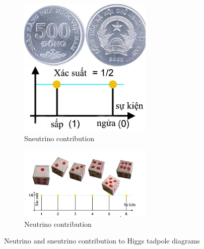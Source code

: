 \begin{figure}[h]
    \centering
    \begin{subfigure}{5cm}
        \centering
        \includegraphics[width=0.7\textwidth]{image/coin.png}
        \caption{Sneutrino contribution}
        \label{Sneutrino tadpole}
    \end{subfigure}
    \begin{subfigure}{0.49\linewidth}
        \centering
        \includegraphics[width=0.7\textwidth]{image/xucxac.png}
        \caption{Neutrino contribution}
        \label{Neutrino tadpole}
    \end{subfigure}
    \caption{Neutrino and sneutrino contribution to Higgs tadpole diagrams}
\label{Tadpole diagrams}
\end{figure}